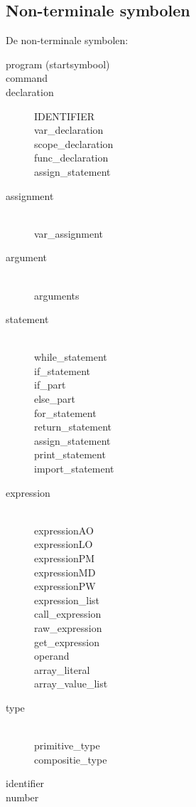 \subsection{Non-terminale symbolen} %
\label{sub:non_terminale_symbolen}
De non-terminale symbolen:
\begin{description}
    \item[program (startsymbool)] 
    \item[command]
    \item[declaration] IDENTIFIER\hfill \\
        var\_declaration \\
        scope\_declaration \\
        func\_declaration \\
        assign\_statement
    \item[assignment] \hfill \\
        var\_assignment
    \item[argument] \hfill \\
        arguments
    \item[statement] \hfill \\
        while\_statement \\
        if\_statement \\ 
        if\_part \\
        else\_part \\
        for\_statement \\
        return\_statement \\
        assign\_statement \\
        print\_statement \\
        import\_statement
    \item[expression] \hfill \\
        expressionAO \\
        expressionLO \\
        expressionPM \\
        expressionMD \\
        expressionPW \\
        expression\_list \\
        call\_expression \\
        raw\_expression \\
        get\_expression \\
        operand \\
        array\_literal \\
        array\_value\_list
    \item[type] \hfill \\
        primitive\_type \\
        compositie\_type
    \item[identifier]
    \item[number]
\end{description}

